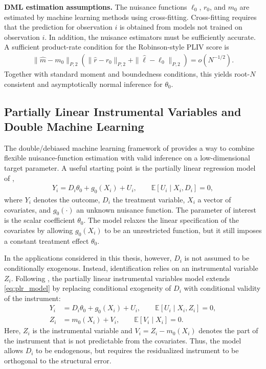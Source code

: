 \documentclass[12pt,a4paper]{article}
\newcommand{\E}{\mathbb{E}}
\begin{document}
\medskip
\noindent
\textbf{DML estimation assumptions.}
The nuisance functions \(\ell_0\), \(r_0\), and \(m_0\) are estimated by machine learning methods
using cross-fitting. Cross-fitting requires that the prediction for observation \(i\) is obtained from
models not trained on observation \(i\). In addition, the nuisance estimators must be sufficiently
accurate. A sufficient product-rate condition for the Robinson-style PLIV score is
\begin{align}
    \|\hat m-m_0\|_{P,2}
    \left(
        \|\hat r-r_0\|_{P,2}
        +
        \|\hat\ell-\ell_0\|_{P,2}
    \right)
    =
    o(N^{-1/2}).
    \label{eq:pliv_product_rate_assumption_block}
\end{align}
Together with standard moment and boundedness conditions, this yields root-\(N\) consistent
and asymptotically normal inference for \(\theta_0\).

\subsection{Partially Linear Instrumental Variables and Double Machine Learning}
\label{subsec:pliv_dml}

The double/debiased machine learning framework of \citet{chernozhukov2018double}
provides a way to combine flexible nuisance-function estimation with valid inference
on a low-dimensional target parameter. A useful starting point is the partially linear
regression model of \citet{robinson1988root},
\begin{align}
    Y_i = D_i \theta_0 + g_0(X_i) + U_i,
    \qquad
    \E[U_i \mid X_i,D_i] = 0,
    \label{eq:plr_model}
\end{align}
where \(Y_i\) denotes the outcome, \(D_i\) the treatment variable, \(X_i\) a vector of
covariates, and \(g_0(\cdot)\) an unknown nuisance function. The parameter of interest
is the scalar coefficient \(\theta_0\). The model relaxes the linear specification of the
covariates by allowing \(g_0(X_i)\) to be an unrestricted function, but it still imposes a
constant treatment effect \(\theta_0\).

In the applications considered in this thesis, however, \(D_i\) is not assumed to be
conditionally exogenous. Instead, identification relies on an instrumental variable
\(Z_i\). Following \citet[Section~4.2]{chernozhukov2018double}, the partially linear
instrumental variables model extends \eqref{eq:plr_model} by replacing conditional
exogeneity of \(D_i\) with conditional validity of the instrument:
\begin{align}
    Y_i &= D_i \theta_0 + g_0(X_i) + U_i,
    \qquad
    \E[U_i \mid X_i,Z_i] = 0,
    \label{eq:pliv_structural} \\
    Z_i &= m_0(X_i) + V_i,
    \qquad
    \E[V_i \mid X_i] = 0.
    \label{eq:pliv_firststage_z}
\end{align}
Here, \(Z_i\) is the instrumental variable and \(V_i = Z_i - m_0(X_i)\) denotes the part
of the instrument that is not predictable from the covariates. Thus, the model allows
\(D_i\) to be endogenous, but requires the residualized instrument to be orthogonal to
the structural error.
\end{document}
